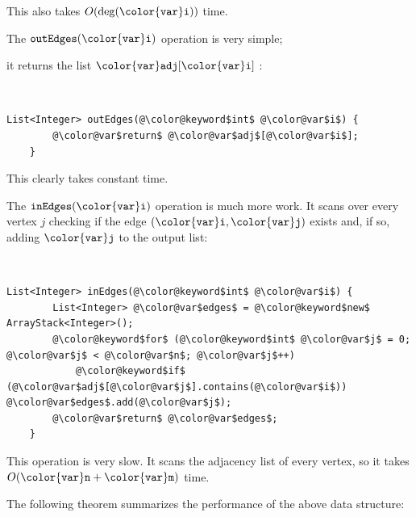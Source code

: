 \documentclass[10pt]{book}
\newcommand{\cpponly}[1]{}\newcommand{\javaonly}[1]{#1}\newcommand{\pcodeonly}[1]{}\newcommand{\notpcode}[1]{#1}\newcommand{\lang}{Java}
\newcommand{\pcodeimport}[1]{}
\theoremstyle{plain}
\theoremstyle{definition}
\begin{document}
This also takes $O(\deg(\ensuremath{\mathtt{{\color{var}i}}}))$ time.

The \ensuremath{\mathtt{outEdges({\color{var}i})}} operation is very simple;
\pcodeonly{it returns the list \ensuremath{\mathtt{{\color{var}adj}[{\color{var}i}]}}}
\javaonly{it returns the list \ensuremath{\mathtt{{\color{var}adj}[{\color{var}i}]}}}
\cpponly{it copies the values in \ensuremath{\mathtt{{\color{var}adj}[{\color{var}i}]}} into the output list}:
\pcodeimport{ods/AdjacencyLists.outEdges(i)}


 \ \vspace{.5ex}\begin{Verbatim}[gobble=1,tabsize=2,frame=single,framerule=1.2pt,commandchars=\\@\$,label=\texttt{AdjacencyLists},labelposition=topline]
	List<Integer> outEdges(@\color@keyword$int$ @\color@var$i$) {
		@\color@var$return$ @\color@var$adj$[@\color@var$i$];
	}
\end{Verbatim}

\javaonly{This clearly takes constant time.}\cpponly{This clearly takes $O(\deg(\ensuremath{\mathtt{{\color{var}i}}}))$ time.}

The \ensuremath{\mathtt{inEdges({\color{var}i})}} operation is much more work.  It scans over every
vertex $j$ checking if the edge \ensuremath{\mathtt{({\color{var}i},{\color{var}j})}} exists and, if so, adding \ensuremath{\mathtt{{\color{var}j}}}
to the output list:
\pcodeimport{ods/AdjacencyLists.inEdges(i)}


 \ \vspace{.5ex}\begin{Verbatim}[gobble=1,tabsize=2,frame=single,framerule=1.2pt,commandchars=\\@\$,label=\texttt{AdjacencyLists},labelposition=topline]
	List<Integer> inEdges(@\color@keyword$int$ @\color@var$i$) {
		List<Integer> @\color@var$edges$ = @\color@keyword$new$ ArrayStack<Integer>();
		@\color@keyword$for$ (@\color@keyword$int$ @\color@var$j$ = 0; @\color@var$j$ < @\color@var$n$; @\color@var$j$++)
			@\color@keyword$if$ (@\color@var$adj$[@\color@var$j$].contains(@\color@var$i$))	@\color@var$edges$.add(@\color@var$j$);
		@\color@var$return$ @\color@var$edges$;
	}
\end{Verbatim}

This operation is very slow. It scans the adjacency list of every vertex,
so it takes $O(\ensuremath{\mathtt{{\color{var}n}}} + \ensuremath{\mathtt{{\color{var}m}}})$ time.

The following theorem summarizes the performance of the above data structure:
\end{document}
